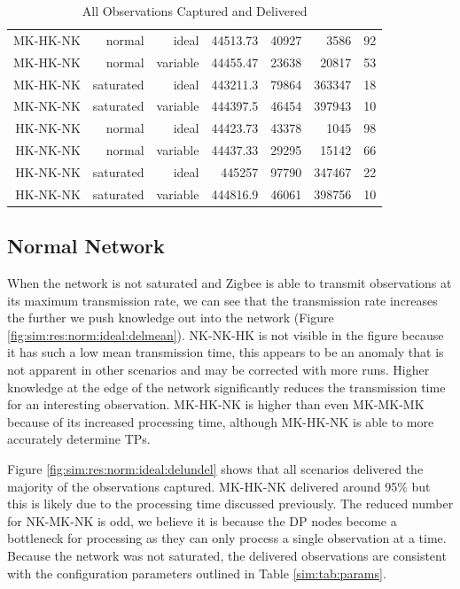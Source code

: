 \begin{landscape}
\begin{table}[htbp]
\begin{tabular}{rrrrrrr}
\rowcolor{Gray}
    MK-HK-NK & normal & ideal & 44513.73 & 40927 & 3586  & 92 \\
\rowcolor{Gray}
    MK-HK-NK & normal & variable & 44455.47 & 23638 & 20817 & 53 \\
\rowcolor{Gray}
    MK-HK-NK & saturated & ideal & 443211.3 & 79864 & 363347 & 18 \\
\rowcolor{Gray}
    MK-NK-NK & saturated & variable & 444397.5 & 46454 & 397943 & 10 \\
    HK-NK-NK & normal & ideal & 44423.73 & 43378 & 1045  & 98 \\
    HK-NK-NK & normal & variable & 44437.33 & 29295 & 15142 & 66 \\
    HK-NK-NK & saturated & ideal & 445257 & 97790 & 347467 & 22 \\
    HK-NK-NK & saturated & variable & 444816.9 & 46061 & 398756 & 10 \\
    \bottomrule

    \end{tabular}%
    \caption{All Observations Captured and Delivered}
\end{table}%
\label{tab:delnum}%
\end{landscape}

\subsection{Normal Network}

When the network is not saturated and Zigbee is able to transmit observations at its maximum transmission rate, we can see that the transmission rate increases the further we push knowledge out into the network (Figure \ref{fig:sim:res:norm:ideal:delmean}). NK-NK-HK is not visible in the figure because it has such a low mean transmission time, this appears to be an anomaly that is not apparent in other scenarios and may be corrected with more runs. Higher knowledge at the edge of the network significantly reduces the transmission time for an interesting observation. MK-HK-NK is higher than even MK-MK-MK because of its increased processing time, although MK-HK-NK is able to more accurately determine TPs.

Figure \ref{fig:sim:res:norm:ideal:delundel} shows that all scenarios delivered the majority of the observations captured. MK-HK-NK delivered around 95\% but this is likely due to the processing time discussed previously. The reduced number for NK-MK-NK is odd, we believe it is because the DP nodes become a bottleneck for processing as they can only process a single observation at a time. Because the network was not saturated, the delivered observations are consistent with the configuration parameters outlined in Table \ref{sim:tab:params}.

